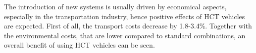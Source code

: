 \documentclass[ExampleMasters.tex]{subfiles}
\begin{document}
The introduction of new systems is usually driven by economical aspects, especially in the transportation industry, hence positive effects of \gls{HCT} vehicles are expected. First of all, the transport costs decrease by 1.8-3.4\%. Together with the environmental costs, that are lower compared to standard combinations, an overall benefit of using \gls{HCT} vehicles can be seen\cite{EMS}.

\end{document}
